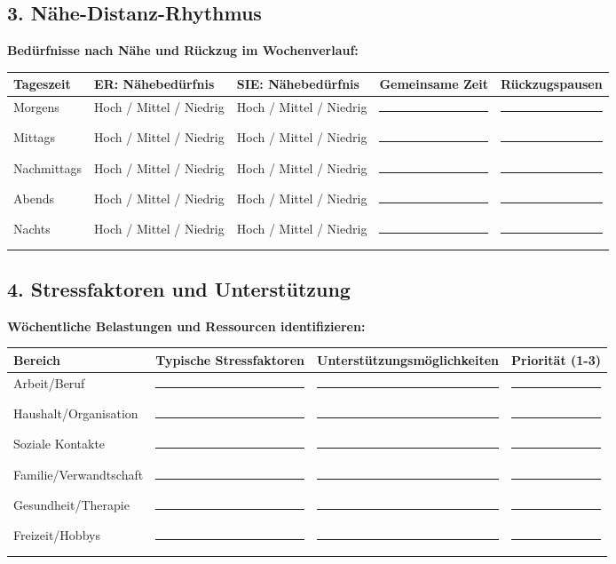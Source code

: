 {\hypertarget{naehe-distanz-rhythmus}{%
\subsection{3. Nähe-Distanz-Rhythmus}}\label{naehe-distanz-rhythmus}

\textbf{Bedürfnisse nach Nähe und Rückzug im Wochenverlauf:}

\begin{center}
\begin{tabular}{|p{2.5cm}|p{2.5cm}|p{2.5cm}|p{2.5cm}|p{3cm}|}
\hline
\textbf{Tageszeit} & \textbf{ER: Nähebedürfnis} & \textbf{SIE: Nähebedürfnis} & \textbf{Gemeinsame Zeit} & \textbf{Rückzugspausen} \\
\hline
Morgens & Hoch / Mittel / Niedrig & Hoch / Mittel / Niedrig & \rule{2cm}{0.4pt} & \rule{2.5cm}{0.4pt} \\
\hline
Mittags & Hoch / Mittel / Niedrig & Hoch / Mittel / Niedrig & \rule{2cm}{0.4pt} & \rule{2.5cm}{0.4pt} \\
\hline
Nachmittags & Hoch / Mittel / Niedrig & Hoch / Mittel / Niedrig & \rule{2cm}{0.4pt} & \rule{2.5cm}{0.4pt} \\
\hline
Abends & Hoch / Mittel / Niedrig & Hoch / Mittel / Niedrig & \rule{2cm}{0.4pt} & \rule{2.5cm}{0.4pt} \\
\hline
Nachts & Hoch / Mittel / Niedrig & Hoch / Mittel / Niedrig & \rule{2cm}{0.4pt} & \rule{2.5cm}{0.4pt} \\
\hline
\end{tabular}
\end{center}

\hypertarget{stressfaktoren-und-unterstuetzung}{%
\subsection{4. Stressfaktoren und Unterstützung}}\label{stressfaktoren-und-unterstuetzung}

\textbf{Wöchentliche Belastungen und Ressourcen identifizieren:}

\begin{center}
\begin{tabular}{|p{3cm}|p{4cm}|p{4cm}|p{3cm}|}
\hline
\textbf{Bereich} & \textbf{Typische Stressfaktoren} & \textbf{Unterstützungsmöglichkeiten} & \textbf{Priorität (1-3)} \\
\hline
Arbeit/Beruf & \rule{3.5cm}{0.4pt} & \rule{3.5cm}{0.4pt} & \rule{2cm}{0.4pt} \\
\hline
Haushalt/Organisation & \rule{3.5cm}{0.4pt} & \rule{3.5cm}{0.4pt} & \rule{2cm}{0.4pt} \\
\hline
Soziale Kontakte & \rule{3.5cm}{0.4pt} & \rule{3.5cm}{0.4pt} & \rule{2cm}{0.4pt} \\
\hline
Familie/Verwandtschaft & \rule{3.5cm}{0.4pt} & \rule{3.5cm}{0.4pt} & \rule{2cm}{0.4pt} \\
\hline
Gesundheit/Therapie & \rule{3.5cm}{0.4pt} & \rule{3.5cm}{0.4pt} & \rule{2cm}{0.4pt} \\
\hline
Freizeit/Hobbys & \rule{3.5cm}{0.4pt} & \rule{3.5cm}{0.4pt} & \rule{2cm}{0.4pt} \\
\hline
\end{tabular}
\end{center}

}
